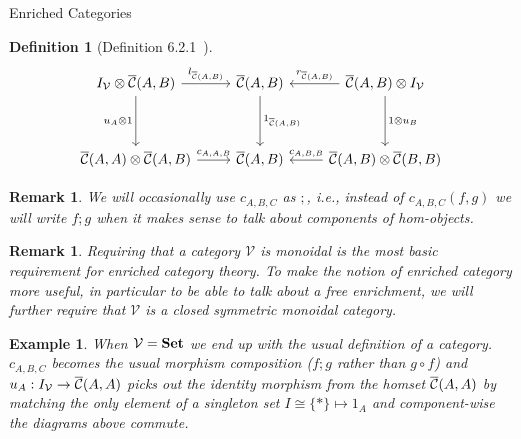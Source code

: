 \documentclass[acmsmall, screen, nonacm]{acmart}
\newtheorem{definition}[theorem]{Definition}
\newtheorem{example}[theorem]{Example}
\newtheorem{remark}[theorem]{Remark}
\begin{document}
\begin{section}{Enriched Categories}
\begin{definition}[Definition 6.2.1~\cite{Borceux_1994}]
  \[
  \begin{tikzcd}
    {I_{\mathcal{V}} \otimes \enriched{C}(A,B)} \arrow[dd, "u_{A} \otimes 1"'] \arrow[r, "{l_{\enriched{C}(A,B)}}"]                                             & {\enriched{C}(A,B)} \arrow[dd, "{1_{\enriched{C}(A,B)}}"] & {\enriched{C}(A,B) \otimes I_{\mathcal{V}}} \arrow[l, "{r_{\enriched{C}(A,B)}}"'] \arrow[dd, "1 \otimes u_{B}"]                                                           \\
    &                                     &                                                                                                                                       \\
{\enriched{C}(A,A) \otimes \enriched{C}(A,B)} \arrow[r, "{c_{A,A,B}}"]                                                                        & {\enriched{C}(A,B)}                            & {\enriched{C}(A,B) \otimes \enriched{C}(B,B)} \arrow[l, "{c_{A,B,B}}"']                                                                                    
\end{tikzcd}
  \]
\end{definition}

\begin{remark}
  We will occasionally use $c_{A,B,C}$ as $;$, \textit{i.e.}, instead of $c_{A,B,C}(f,g)$ we will write $f ; g$ when it makes sense to talk about components of hom-objects.
\end{remark}

\begin{remark}

Requiring that a category $\mathcal{V}$ is monoidal is the most basic requirement for enriched category theory.
To make the notion of enriched category more useful, in particular to be able to talk about a free enrichment, we will further require that $\mathcal{V}$ is a closed symmetric monoidal category.
\end{remark}

\begin{example}
When $\mathcal{V} = \mathbf{Set}$ we end up with the usual definition of a category.
$c_{A,B,C}$ becomes the usual morphism composition ($f;g$ rather than $g \circ f$) and $u_{A} : I_{\mathcal{V}} \to {\overline{\mathcal{C}}}(A,A)$ picks out the identity morphism from the homset ${\overline{\mathcal{C}}}(A,A)$ by matching the only element of a singleton set $I \cong \{*\} \mapsto 1_{A}$ and component-wise the diagrams above commute.
\end{example}


\end{section}
\end{document}
